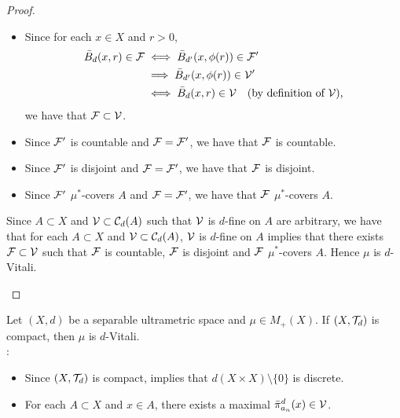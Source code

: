 \documentclass{book}
\begin{document}
\begin{proof}
\begin{itemize}
\begin{itemize}
				\begin{itemize}
					\item Since for each $x \in X$ and $r>0$, 
					\begin{align*}
						\bar{B}_d(x,r) \in \mathcal{F} 
						& \iff \bar{B}_{d'}(x, \phi(r)) \in \mathcal{F}' \\
						& \implies \bar{B}_{d'}(x, \phi(r)) \in \mathcal{V}' \\
						& \iff \bar{B}_d(x,r) \in \mathcal{V} \quad \text{(by definition of $\mathcal{V}$),}
					\end{align*}
					we have that $\mathcal{F} \subset \mathcal{V}$.
					\item Since $\mathcal{F}'$ is countable and $\mathcal{F} = \mathcal{F}'$, we have that $\mathcal{F}$ is countable. 
					\item Since $\mathcal{F}'$ is disjoint and $\mathcal{F} = \mathcal{F}'$, we have that $\mathcal{F}$ is disjoint.
					\item Since $\mathcal{F}'$ $\mu^*$-covers $A$ and $\mathcal{F} = \mathcal{F}'$, we have that $\mathcal{F}$ $\mu^*$-covers $A$.
				\end{itemize}
			\end{itemize}
			Since $A \subset X$ and $\mathcal{V} \subset \mathcal{C}_d(A)$ such that $\mathcal{V}$ is $d$-fine on $A$ are arbitrary, we have that for each $A \subset X$ and $\mathcal{V} \subset \mathcal{C}_d(A)$, $\mathcal{V}$ is $d$-fine on $A$ implies that there exists $\mathcal{F} \subset \mathcal{V}$ such that $\mathcal{F}$ is countable, $\mathcal{F}$ is disjoint and $\mathcal{F}$ $\mu^*$-covers $A$. Hence $\mu$ is $d$-Vitali.
		\end{itemize}
	\end{proof}
	
	\begin{note}
	\end{note}
	
	\begin{ex} 
		Let $(X, d)$ be a separable ultrametric space and $\mu \in M_+(X)$. If $(X, \mathcal{T}_d)$ is compact, then $\mu$ is $d$-Vitali. \\
		: 
		\begin{itemize}
			\item Since $(X, \mathcal{T}_d)$ is compact,  implies that $d(X \times X) \setminus \{0\}$ is discrete. 
			\item For each $A \subset X$ and $x \in A$, there exists a maximal $\bar{\pi}^{d}_{a_n}(x) \in \mathcal{V}$.
		\end{itemize}
	\end{ex}
	
\end{document}
